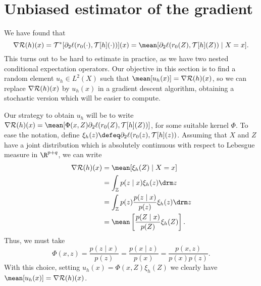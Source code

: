 \section{Unbiased estimator of the gradient}

We have found that
\begin{equation*}
    \nabla \risk ( h ) ( x )
    = \mathcal{T}^{ * } [ \partial_{ 2 } \ell ( r_{ 0 } ( \cdot ), \mathcal{T} [ h ] ( \cdot ) ) ] ( x )
    = \mean [ \partial_{ 2 } \ell ( r_{ 0 } ( Z ), \mathcal{T} [ h ] ( Z ) ) \mid X = x ]
.\end{equation*}
This turns out to be hard to estimate in practice, as we have two nested conditional expectation operators.
Our objective in this section is to find a random element $ u_{ h } \in L^{ 2 } ( X ) $ such that $ \mean [ u_{ h } ( x ) ] = \nabla \risk ( h ) ( x ) $, so we can replace $ \nabla \mathcal{R} ( h ) ( x ) $ by $ u_{ h } ( x ) $ in a gradient descent algorithm, obtaining a stochastic version which will be easier to compute.

Our strategy to obtain $ u_{ h } $ will be to write $ \nabla \risk ( h ) ( x ) = \mean [ \Phi ( x, Z ) \partial_{ 2 } \ell ( r_{ 0 } ( Z ), \mathcal{T} [ h ] ( Z ) ) ] $, for some suitable kernel $ \Phi $.
To ease the notation, define $ \xi_{ h } ( z ) \defeq \partial_{ 2 } \ell ( r_{ 0 } ( z ), \mathcal{T} [ h ] ( z ) ) $.
Assuming that $ X $ and $ Z $ have a joint distribution which is absolutely continuous with respect to Lebesgue measure in $ \R^{ p + q } $, we can write
\begin{align*}
    \nabla \risk ( h ) ( x )
    &= \mean [ \xi_{ h } ( Z ) \mid X = x ] \\
    &= \int_{ \mathbb{Z} } p ( z \mid x ) \xi_{ h } ( z ) \drm z \\
    &= \int_{ \mathbb{Z} } p ( z ) \frac{ p ( z \mid x ) }{ p ( z ) } \xi_{ h } ( z ) \drm z \\
    &= \mean \left[
        \frac{ p ( Z \mid x ) }{ p ( Z ) } \xi_{ h } ( Z )
    \right]
.\end{align*}
Thus, we must take
\begin{equation*}
    \Phi ( x, z )
    = \frac{ p ( z \mid x ) }{ p ( z ) }
    = \frac{ p ( x \mid z ) }{ p ( x ) }
    = \frac{ p ( x, z ) }{ p ( x ) p ( z ) }
.\end{equation*}
With this choice, setting $ u_{ h } ( x ) = \Phi ( x, Z ) \xi_{ h } ( Z ) $ we clearly have $ \mean [ u_{ h } ( x ) ] = \nabla \risk ( h ) ( x ) $.
